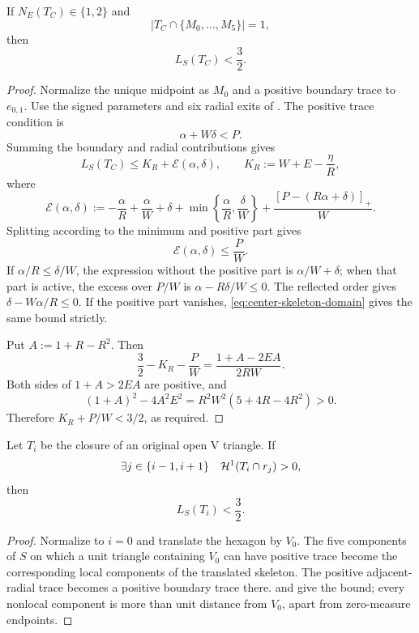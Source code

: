 \begin{lemma}
\label{lem:center-skeleton-cap}
\label{lem:app-center-skeleton-cap-calculation}

If $N_E(T_C)\in\{1,2\}$ and
\[
 \left|T_C\cap\{M_0,\ldots,M_5\}\right|=1,
\]
then
\[
 L_S(T_C)<\frac32.
\]
\end{lemma}
\begin{proof}
Normalize the unique midpoint as $M_0$ and a positive boundary trace to
$e_{0,1}$.  Use the signed parameters and six radial exits of
. The positive trace condition is
\begin{equation}
 \alpha+W\delta<P.
 \label{eq:center-skeleton-domain}
\end{equation}
Summing the boundary and radial contributions gives
\[
 L_S(T_C)\le K_R+\mathcal E(\alpha,\delta),
 \qquad K_R:=W+E-\frac\eta R,
\]
where
\[
 \mathcal E(\alpha,\delta)
 :=-\frac\alpha R+\frac\alpha W+\delta
 +\min\left\{\frac\alpha R,\frac\delta W\right\}
 +\frac{[P-(R\alpha+\delta)]_+}{W}.
\]
Splitting according to the minimum and positive part gives
\begin{equation}
 \mathcal E(\alpha,\delta)\le\frac PW.
 \label{eq:center-skeleton-E-bound}
\end{equation}
If $\alpha/R\le\delta/W$, the expression without the positive part is
$\alpha/W+\delta$; when that part is active, the excess over $P/W$ is
$\alpha-R\delta/W\le0$.  The reflected order gives
$\delta-W\alpha/R\le0$.  If the positive part vanishes,
\eqref{eq:center-skeleton-domain} gives the same bound strictly.

Put $A:=1+R-R^2$.  Then
\[
 \frac32-K_R-\frac PW=\frac{1+A-2EA}{2RW}.
\]
Both sides of $1+A>2EA$ are positive, and
\[
 (1+A)^2-4A^2E^2=R^2W^2(5+4R-4R^2)>0.
\]
Therefore $K_R+P/W<3/2$, as required.
\end{proof}

\begin{lemma}
\label{lem:positive-support-skeleton-cap}
Let $T_i$ be the closure of an original open V triangle.  If
\[
 \exists j\in\{i-1,i+1\}\quad\mathcal H^1(T_i\cap r_j)>0,
\]
then
\[
 L_S(T_i)<\frac32.
\]
\end{lemma}

\begin{proof}
Normalize to $i=0$ and translate the hexagon by $V_0$.  The five components
of $S$ on which a unit triangle containing $V_0$ can have positive trace
become the corresponding local components of the translated skeleton.  The
positive adjacent-radial trace becomes a positive boundary trace there.
 and
 give the bound; every nonlocal component
is more than unit distance from $V_0$, apart from zero-measure endpoints.
\end{proof}

